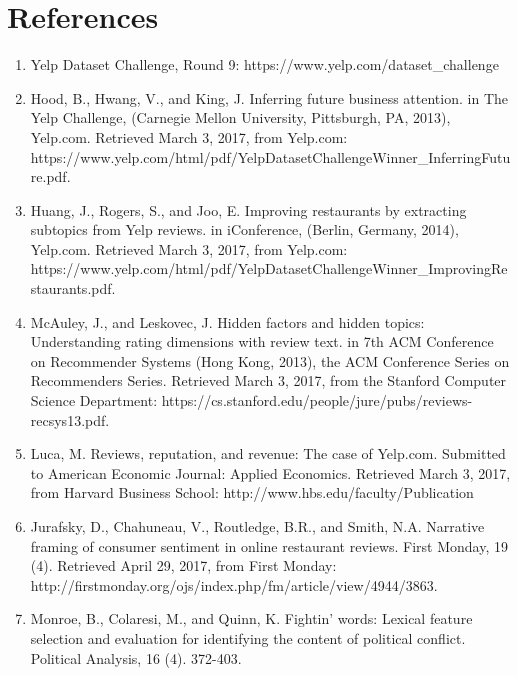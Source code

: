 \section{References}

\begin{enumerate}
	\item Yelp Dataset Challenge, Round 9: https://www.yelp.com/dataset_challenge

	\item Hood, B., Hwang, V., and King, J. Inferring future business attention. in The Yelp Challenge, (Carnegie Mellon University, Pittsburgh, PA, 2013), Yelp.com. Retrieved March 3, 2017, from Yelp.com: https://www.yelp.com/html/pdf/YelpDatasetChallengeWinner_InferringFuture.pdf.

    \item Huang, J., Rogers, S., and Joo, E. Improving restaurants by extracting subtopics from Yelp reviews. in iConference, (Berlin, Germany, 2014), Yelp.com. Retrieved March 3, 2017, from Yelp.com: https://www.yelp.com/html/pdf/YelpDatasetChallengeWinner_ImprovingRestaurants.pdf.

    \item McAuley, J., and Leskovec, J. Hidden factors and hidden topics: Understanding rating dimensions with review text. in 7th ACM Conference on Recommender Systems (Hong Kong, 2013), the ACM Conference Series on Recommenders Series. Retrieved March 3, 2017, from the Stanford Computer Science Department: https://cs.stanford.edu/people/jure/pubs/reviews-recsys13.pdf.

    \item Luca, M. Reviews, reputation, and revenue: The case of Yelp.com. Submitted to American Economic Journal: Applied Economics. Retrieved March 3, 2017, from Harvard Business School: http://www.hbs.edu/faculty/Publication%

    \item Jurafsky, D., Chahuneau, V., Routledge, B.R., and Smith, N.A. Narrative framing of consumer sentiment in online restaurant reviews. First Monday, 19 (4). Retrieved April 29, 2017, from First Monday: http://firstmonday.org/ojs/index.php/fm/article/view/4944/3863.

    \item Monroe, B., Colaresi, M., and Quinn, K. Fightin’ words: Lexical feature selection and evaluation for identifying the content of political conflict. Political Analysis, 16 (4). 372-403.

\end{enumerate}


